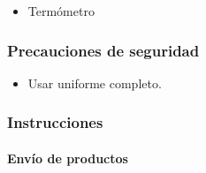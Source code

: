 \begin{itemize}
	\item Termómetro
\end{itemize}

\subsubsection{Precauciones de seguridad}
\begin{itemize}
	\item Usar uniforme completo.
\end{itemize}

\subsubsection{Instrucciones}
\paragraph{Envío de productos}
